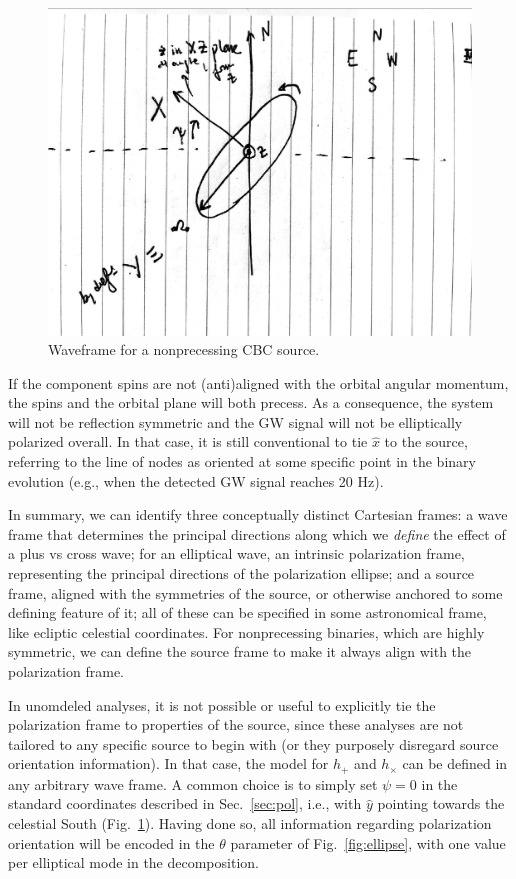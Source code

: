 \documentclass[aps,prd,twocolumn,superscriptaddress,preprintnumbers,floatfix,nofootinbib]{revtex4-2}
\newcommand*{\red}[1]{#1}
\newcommand*{\red}[1]{{\color{purple} #1}}
\begin{document}
\begin{figure}
\includegraphics[width=\columnwidth]{waveframe}
\caption{Waveframe for a nonprecessing CBC source.}
\label{fig:waveframe}
\end{figure}

If the component spins are not (anti)aligned with the orbital angular momentum, the spins and the orbital plane will both precess.
As a consequence, the system will not be reflection symmetric and the GW signal will not be elliptically polarized overall.
In that case, it is still conventional to tie $\hat{x}$ to the source, referring to the line of nodes as oriented at some specific point in the binary evolution (e.g., when the detected GW signal reaches 20 Hz).

In summary, we can identify three conceptually distinct Cartesian frames: a wave frame that determines the principal directions along which we \emph{define} the effect of a plus vs cross wave; for an elliptical wave, an intrinsic polarization frame, representing the principal directions of the polarization ellipse; and a source frame, aligned with the symmetries of the source, or otherwise anchored to some defining feature of it; all of these can be specified in some astronomical frame, like ecliptic celestial coordinates.
For nonprecessing binaries, which are highly symmetric, we can define the source frame to make it always align with the polarization frame.

In unomdeled analyses, it is not possible or useful to explicitly tie the polarization frame to properties of the source, since these analyses are not tailored to any specific source to begin with (or they purposely disregard source orientation information).
In that case, the model for $h_+$ and $h_\times$ can be defined in any arbitrary wave frame.
A common choice is to simply set $\psi = 0$ in the standard coordinates described in Sec.~\ref{sec:pol}, i.e., \red{with $\hat{y}$ pointing towards the celestial South} (Fig.~\ref{fig:waveframe}).
Having done so, all information regarding polarization orientation will be encoded in the $\theta$ parameter of Fig.~\ref{fig:ellipse}, with one value per elliptical mode in the decomposition.
\end{document}
